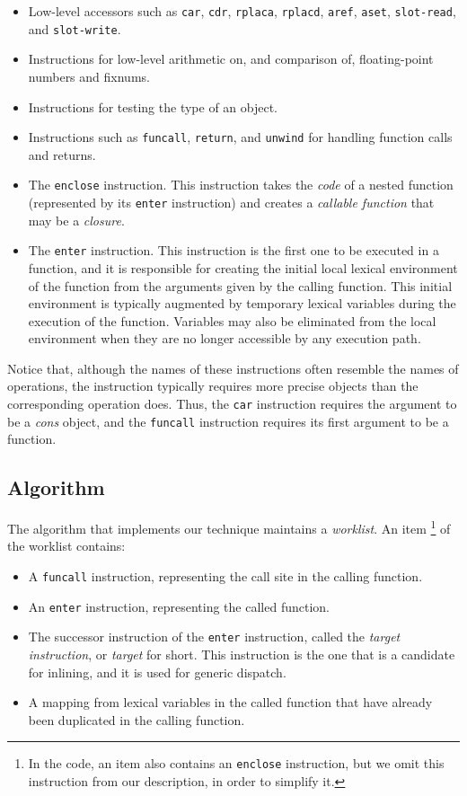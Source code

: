 \begin{itemize}
\item Low-level accessors such as \texttt{car}, \texttt{cdr},
  \texttt{rplaca}, \texttt{rplacd}, \texttt{aref}, \texttt{aset},
  \texttt{slot-read}, and \texttt{slot-write}.
\item Instructions for low-level arithmetic on, and comparison of,
  floating-point numbers and fixnums.
\item Instructions for testing the type of an object.
\item Instructions such as \texttt{funcall}, \texttt{return}, and
  \texttt{unwind} for handling function calls and returns.
\item The \texttt{enclose} instruction.  This instruction takes the
  \emph{code} of a nested function (represented by its \texttt{enter}
  instruction) and creates a \emph{callable function} that may be a
  \emph{closure}.
\item The \texttt{enter} instruction.  This instruction is the first
  one to be executed in a function, and it is responsible for creating
  the initial local lexical environment of the function from the
  arguments given by the calling function.  This initial environment
  is typically augmented by temporary lexical variables during the
  execution of the function.  Variables may also be eliminated from
  the local environment when they are no longer accessible by any
  execution path.
\end{itemize}

Notice that, although the names of these instructions often resemble
the names of \commonlisp{} operations, the instruction typically
requires more precise objects than the corresponding \commonlisp{}
operation does.  Thus, the \texttt{car} instruction requires the
argument to be a \emph{cons} object, and the \texttt{funcall}
instruction requires its first argument to be a function.

\subsection{Algorithm}

The algorithm that implements our technique maintains a
\emph{worklist}.  An item%
\footnote{In the code, an item also contains an \texttt{enclose}
  instruction, but we omit this instruction from our description, in
  order to simplify it.}
of the worklist contains:

\begin{itemize}
\item A \texttt{funcall} instruction, representing the call site in the
  calling function.
\item An \texttt{enter} instruction, representing the called function.
\item The successor instruction of the \texttt{enter} instruction,
  called the \emph{target instruction}, or \emph{target} for short.
  This instruction is the one that is a candidate for inlining, and it
  is used for generic dispatch.
\item A mapping from lexical variables in the called function that
  have already been duplicated in the calling function.
\end{itemize}

